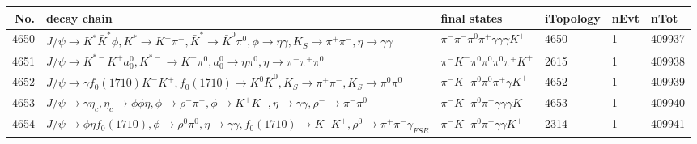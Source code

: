 \begin{table}[htbp] 
\begin{center}
\begin{small}
\begin{tabular}{rlllll}\hline\hline
 No. & decay chain & final states &  iTopology & nEvt & nTot \\\hline
4650&$J/\psi       \rightarrow K^{*}          \bar{K}^{*}   \phi           , K^{*}           \rightarrow K^{+}          \pi^{-}        , \bar{K}^{*}    \rightarrow \bar{K}^{0}   \pi^{0}        , \phi            \rightarrow \eta          \gamma       , K_{S}           \rightarrow \pi^{+}        \pi^{-}        , \eta           \rightarrow \gamma       \gamma       $&$\pi^{-}        \pi^{-}        \pi^{0}        \pi^{+}        \gamma       \gamma       \gamma       K^{+}          $& 4650&    1&409937\\
4651&$J/\psi       \rightarrow K^{*-}         K^{+}          a_{0}^{0}      , K^{*-}          \rightarrow K^{-}          \pi^{0}        , a_{0}^{0}       \rightarrow \eta          \pi^{0}        , \eta           \rightarrow \pi^{-}        \pi^{+}        \pi^{0}        $&$\pi^{-}        K^{-}          \pi^{0}        \pi^{0}        \pi^{0}        \pi^{+}        K^{+}          $& 2615&    1&409938\\
4652&$J/\psi       \rightarrow \gamma       f_{0}(1710)    K^{-}          K^{+}          , f_{0}(1710)     \rightarrow K^{0}          \bar{K}^{0}   , K_{S}           \rightarrow \pi^{+}        \pi^{-}        , K_{S}           \rightarrow \pi^{0}        \pi^{0}        $&$\pi^{-}        K^{-}          \pi^{0}        \pi^{0}        \pi^{+}        \gamma       K^{+}          $& 4652&    1&409939\\
4653&$J/\psi       \rightarrow \gamma       \eta_{c}    , \eta_{c}     \rightarrow \phi           \phi           \eta          , \phi            \rightarrow \rho^{-}      \pi^{+}        , \phi            \rightarrow K^{+}          K^{-}          , \eta           \rightarrow \gamma       \gamma       , \rho^{-}       \rightarrow \pi^{-}        \pi^{0}        $&$\pi^{-}        K^{-}          \pi^{0}        \pi^{+}        \gamma       \gamma       \gamma       K^{+}          $& 4653&    1&409940\\
4654&$J/\psi       \rightarrow \phi           \eta          f_{0}(1710)    , \phi            \rightarrow \rho^{0}      \pi^{0}        , \eta           \rightarrow \gamma       \gamma       , f_{0}(1710)     \rightarrow K^{-}          K^{+}          , \rho^{0}       \rightarrow \pi^{+}        \pi^{-}        \gamma_{FSR} $&$\pi^{-}        K^{-}          \pi^{0}        \pi^{+}        \gamma       \gamma       K^{+}          $& 2314&    1&409941\\

\end{tabular}
\end{small}
\end{center}
\end{table}
